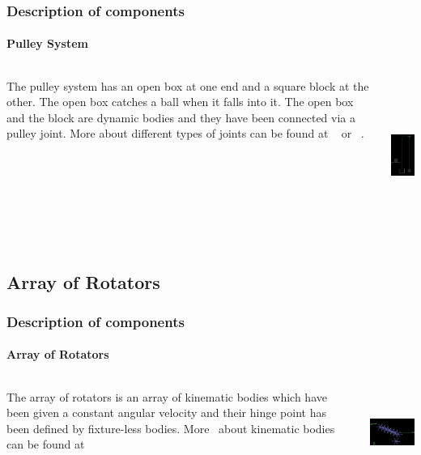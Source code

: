 \begin{frame}

\frametitle{Description of components}
\framesubtitle{Pulley System}
\begin{columns}
\begin{column}{.7\textwidth}
\begin{scriptsize}
The pulley system has an open box at one end and a square block at the other. The open box catches a ball when it falls into it.
\pause
\linebreak
The open box and the block are dynamic bodies and they have been connected via a pulley joint. More about different types of joints can be found at ~\cite{Site1} or ~\cite{Site2}.
\end{scriptsize}  
\end{column}
\begin{column}{.4\textwidth}
\pause
\includegraphics[width=3cm,height=5cm]{dd2}
\end{column}
\end{columns}

\end{frame}


\subsection{Array of Rotators}

\begin{frame}

\frametitle{Description of components}
\framesubtitle{Array of Rotators}
\begin{columns}
\begin{column}{.7\textwidth}
\begin{scriptsize}
The array of rotators is an array of kinematic bodies which have been given a constant angular velocity and their hinge point has been defined by fixture-less bodies. More \
about kinematic bodies can be found at ~\cite{Site3} 
\end{scriptsize}  
\end{column}
\begin{column}{.4\textwidth}
\pause
\includegraphics[width=4.5cm,height=2.8cm]{dd3}
\end{column}
\end{columns}

\end{frame}


